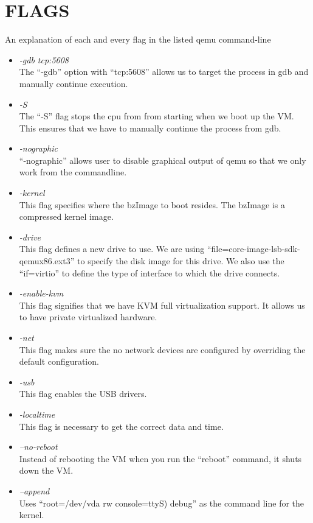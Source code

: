 \documentclass{article}
\begin{document}
\section{FLAGS}
    An explanation of each and every flag in the listed qemu command-line \\ 
    \begin{itemize}
      \item \textit{-gdb tcp:5608} \\ The “-gdb” option with “tcp:5608” allows us to target the process in gdb and manually continue execution. 
      \item \textit{-S} \\ The “-S” flag stops the cpu from from starting when we boot up the VM. This ensures that we have to manually continue the process from gdb.
      \item \textit{-nographic} \\ “-nographic” allows user to disable graphical output of qemu so that we only work from the commandline.
      \item \textit{-kernel} \\ This flag specifies where the bzImage to boot resides. The bzImage is a compressed kernel image.
      \item \textit{-drive} \\This flag defines a new drive to use. We are using “file=core-image-lsb-sdk-qemux86.ext3” to specify the disk image for this drive. We also use the “if=virtio” to define the type of interface to which the drive connects.
      \item \textit{-enable-kvm} \\ This flag signifies that we have KVM full virtualization support. It allows us to have private virtualized hardware.
      \item \textit{-net} \\ This flag makes sure the no network devices are configured by overriding the default configuration.
      \item \textit{-usb} \\ This flag enables the USB drivers.
      \item \textit{-localtime} \\ This flag is necessary to get the correct data and time.
      \item \textit{ --no-reboot} \\ Instead of rebooting the VM when you run the “reboot” command, it shuts down the VM.
      \item \textit{--append} \\ Uses “root=/dev/vda rw console=ttyS) debug” as the command line for the kernel.
    \end{itemize} \newpage
    
\end{document}
